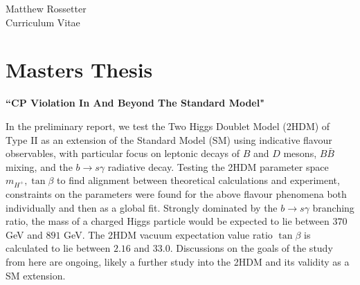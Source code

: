 \documentclass[10pt]{article} %
\begin{document}
\begin{paracol}{2} %


\parbox[top][0.12\textheight][c]{\linewidth}{ %
	\vspace{-0.04\textheight} %
	\centering %
	{\sffamily\Huge Matthew Rossetter}\\\medskip %
	{\Huge\color{headings}\cvtextfont Curriculum Vitae}
}


\section{Masters Thesis}

{\raggedright\textbf{``CP Violation In And Beyond The Standard Model"}\\\medskip}

In the preliminary report, we test the Two Higgs Doublet Model (2HDM) of Type II as an extension of the Standard Model (SM) using indicative flavour observables, with particular focus on leptonic decays of $B$ and $D$ mesons, $B\bar{B}$ mixing, and the $b\to s\gamma$ radiative decay.
Testing the 2HDM parameter space $m_{H^+},\tan\beta$ to find alignment between theoretical calculations and experiment, constraints on the parameters were found for the above flavour phenomena both individually and then as a global fit. Strongly dominated by the $b\to s\gamma$ branching ratio, the mass of a charged Higgs particle would be expected to lie between $370$ GeV and $891$ GeV. 
The 2HDM vacuum expectation value ratio $\tan\beta$ is calculated to lie between $2.16$ and $33.0$.
Discussions on the goals of the study from here are ongoing, likely a further study into the 2HDM and its validity as a SM extension. 



\end{paracol}
\end{document}

